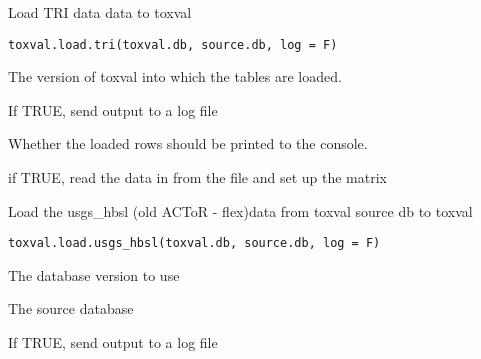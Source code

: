 \documentclass[letterpaper]{book}
\begin{document}
%
\begin{Description}\relax
Load TRI data data to toxval
\end{Description}
%
\begin{Usage}
\begin{verbatim}
toxval.load.tri(toxval.db, source.db, log = F)
\end{verbatim}
\end{Usage}
%
\begin{Arguments}
\begin{ldescription}
\item[\code{toxval.db}] The version of toxval into which the tables are loaded.

\item[\code{log}] If TRUE, send output to a log file

\item[\code{verbose}] Whether the loaded rows should be printed to the console.

\item[\code{do.init}] if TRUE, read the data in from the file and set up the matrix
\end{ldescription}
\end{Arguments}
%
\begin{Description}\relax
Load the usgs\_hbsl (old ACToR - flex)data  from toxval source db to toxval
\end{Description}
%
\begin{Usage}
\begin{verbatim}
toxval.load.usgs_hbsl(toxval.db, source.db, log = F)
\end{verbatim}
\end{Usage}
%
\begin{Arguments}
\begin{ldescription}
\item[\code{toxval.db}] The database version to use

\item[\code{source.db}] The source database

\item[\code{log}] If TRUE, send output to a log file
\end{ldescription}
\end{Arguments}
\end{document}
